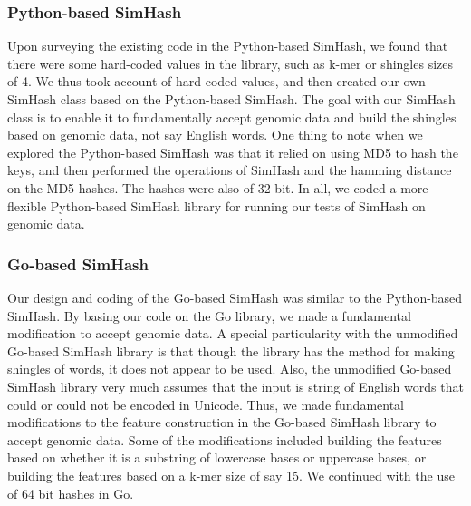 \documentclass[12pt, letterpaper]{article}
\begin{document}
\subsubsection{Python-based SimHash}
Upon surveying the existing code in the Python-based SimHash, we found that there were some hard-coded values in the library, such as k-mer or shingles sizes of 4. We thus took account of hard-coded values, and then created our own SimHash class based on the Python-based SimHash. The goal with our SimHash class is to enable it to fundamentally accept genomic data and build the shingles based on genomic data, not say English words. One thing to note when we explored the Python-based SimHash was that it relied on using MD5 to hash the keys, and then performed the operations of SimHash and the hamming distance on the MD5 hashes. The hashes were also of 32 bit. In all, we coded a more flexible Python-based SimHash library for running our tests of SimHash on genomic data.

\subsubsection{Go-based SimHash}
Our design and coding of the Go-based SimHash was similar to the Python-based SimHash. By basing our code on the Go library, we made a fundamental modification to accept genomic data. A special particularity with the unmodified Go-based SimHash library is that though the library has the method for making shingles of words, it does not appear to be used. Also, the unmodified Go-based SimHash library very much assumes that the input is string of English words that could or could not be encoded in Unicode. Thus, we made fundamental modifications to the feature construction in the Go-based SimHash library to accept genomic data. Some of the modifications included building the features based on whether it is a substring of lowercase bases or uppercase bases, or building the features based on a k-mer size of say 15. We continued with the use of 64 bit hashes in Go.
\end{document}
